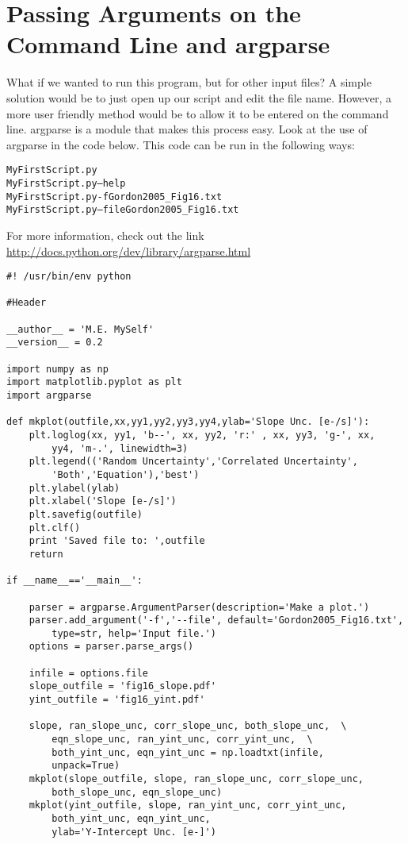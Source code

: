 \section{Passing Arguments on the Command Line and {\sf argparse}}
What if we wanted to run this program, but for other input files?  A
simple solution would be to just open up our script and edit the file
name.  However, a more user friendly method would be to allow it to be
entered on the command line.  {\sf\small argparse} is a module that
makes this process easy.  Look at the use of {\sf\small
  argparse} in the code below.  This code can be run in the following
ways:
\begin{alltt}
\termtab MyFirstScript.py 
\termtab MyFirstScript.py --help
\termtab MyFirstScript.py -f Gordon2005_Fig16.txt
\termtab MyFirstScript.py --file Gordon2005_Fig16.txt
\end{alltt}
For more information, check out the link
\url{http://docs.python.org/dev/library/argparse.html}

\begin{verbatim}
#! /usr/bin/env python

#Header

__author__ = 'M.E. MySelf'
__version__ = 0.2

import numpy as np
import matplotlib.pyplot as plt
import argparse

def mkplot(outfile,xx,yy1,yy2,yy3,yy4,ylab='Slope Unc. [e-/s]'):
    plt.loglog(xx, yy1, 'b--', xx, yy2, 'r:' , xx, yy3, 'g-', xx,  
        yy4, 'm-.', linewidth=3) 
    plt.legend(('Random Uncertainty','Correlated Uncertainty',  
        'Both','Equation'),'best')
    plt.ylabel(ylab) 
    plt.xlabel('Slope [e-/s]') 
    plt.savefig(outfile) 
    plt.clf()
    print 'Saved file to: ',outfile 
    return  
    
if __name__=='__main__': 

    parser = argparse.ArgumentParser(description='Make a plot.')
    parser.add_argument('-f','--file', default='Gordon2005_Fig16.txt', 
        type=str, help='Input file.')
    options = parser.parse_args()

    infile = options.file 
    slope_outfile = 'fig16_slope.pdf'  
    yint_outfile = 'fig16_yint.pdf'  
    
    slope, ran_slope_unc, corr_slope_unc, both_slope_unc,  \
        eqn_slope_unc, ran_yint_unc, corr_yint_unc,  \
        both_yint_unc, eqn_yint_unc = np.loadtxt(infile, 
        unpack=True) 
    mkplot(slope_outfile, slope, ran_slope_unc, corr_slope_unc,  
        both_slope_unc, eqn_slope_unc) 
    mkplot(yint_outfile, slope, ran_yint_unc, corr_yint_unc,  
        both_yint_unc, eqn_yint_unc,
        ylab='Y-Intercept Unc. [e-]')
\end{verbatim}


